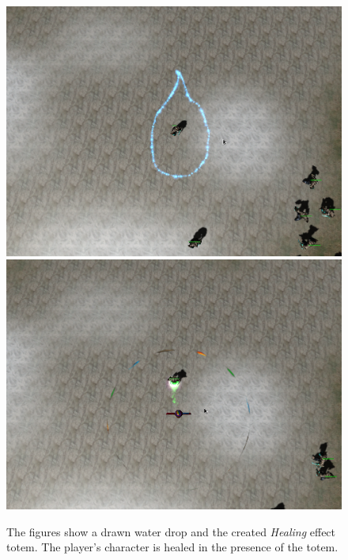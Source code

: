 \begin{figure}[p]
\centering
\includegraphics[width=.9\linewidth]{ext/scr/waterDrop.png}
\quad
\includegraphics[width=.9\linewidth]{ext/scr/waterDrope.png}
\caption{The figures show a drawn water drop and the created \emph{Healing} effect totem. The player's character is healed in the presence of the totem.}
\label{fig:spell:waterDrop}
\end{figure}

